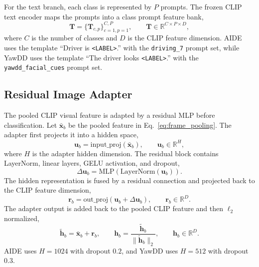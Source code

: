 For the text branch, each class is represented by $P$ prompts. The frozen CLIP text encoder maps the prompts into a class prompt feature bank,
\begin{equation}
    \mathbf{T} = \{\mathbf{T}_{c,p}\}_{c=1,p=1}^{C,P},
    \qquad \mathbf{T} \in \mathbb{R}^{C \times P \times D},
    \label{eq:prompt_bank}
\end{equation}
where $C$ is the number of classes and $D$ is the CLIP feature dimension. AIDE uses the template ``Driver is \texttt{<LABEL>}.'' with the \texttt{driving\_7} prompt set, while YawDD uses the template ``The driver looks \texttt{<LABEL>}.'' with the \texttt{yawdd\_facial\_cues} prompt set.

\subsection{Residual Image Adapter}
\label{sec:image_adapter}

The pooled CLIP visual feature is adapted by a residual MLP before classification. Let $\bar{\mathbf{x}}_{b}$ be the pooled feature in Eq.~\eqref{eq:frame_pooling}. The adapter first projects it into a hidden space,
\begin{equation}
    \mathbf{u}_{b} = \mathrm{input\_proj}(\bar{\mathbf{x}}_{b}),
    \qquad \mathbf{u}_{b} \in \mathbb{R}^{H},
    \label{eq:adapter_input_proj}
\end{equation}
where $H$ is the adapter hidden dimension. The residual block contains LayerNorm, linear layers, GELU activation, and dropout,
\begin{equation}
    \Delta \mathbf{u}_{b} = \mathrm{MLP}(\mathrm{LayerNorm}(\mathbf{u}_{b})).
    \label{eq:adapter_residual_block}
\end{equation}
The hidden representation is fused by a residual connection and projected back to the CLIP feature dimension,
\begin{equation}
    \mathbf{r}_{b} = \mathrm{out\_proj}(\mathbf{u}_{b} + \Delta \mathbf{u}_{b}),
    \qquad \mathbf{r}_{b} \in \mathbb{R}^{D}.
    \label{eq:adapter_out_proj}
\end{equation}
The adapter output is added back to the pooled CLIP feature and then $\ell_2$ normalized,
\begin{equation}
    \tilde{\mathbf{h}}_{b} = \bar{\mathbf{x}}_{b} + \mathbf{r}_{b},
    \qquad
    \mathbf{h}_{b} = \frac{\tilde{\mathbf{h}}_{b}}{\|\tilde{\mathbf{h}}_{b}\|_{2}},
    \qquad \mathbf{h}_{b} \in \mathbb{R}^{D}.
    \label{eq:adapter_l2_norm}
\end{equation}
AIDE uses $H=1024$ with dropout $0.2$, and YawDD uses $H=512$ with dropout $0.3$.

